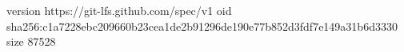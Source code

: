 version https://git-lfs.github.com/spec/v1
oid sha256:c1a7228ebc209660b23cea1de2b91296de190e77b852d3fdf7e149a31b6d3330
size 87528

